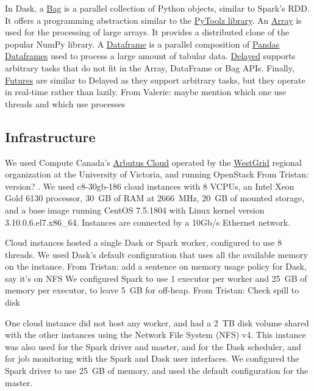 \documentclass[conference]{IEEEtran}
\newcommand{\TG}[1]{\color{cyan}From Tristan: #1 \color{black}}
\newcommand{\VHS}[1]{\color{green}From Valerie: #1 \color{black}}
\begin{document}
In Dask, a \href{https://docs.dask.org/en/latest/bag.html}{Bag} is a parallel
collection of Python objects, similar to Spark's RDD. It offers a programming
abstraction similar to the \href{https://toolz.readthedocs.io/en/latest/}{PyToolz
library}. An \href{https://docs.dask.org/en/latest/array.html}{Array} is used for the
processing of large arrays. It provides a distributed clone of the popular NumPy
library. A \href{https://docs.dask.org/en/latest/dataframe.html}{Dataframe} is a
parallel composition of
\href{http://pandas.pydata.org/pandas-docs/stable/reference/api/pandas.DataFrame.html}{Pandas
Dataframes} used to process a large amount of tabular data.
\href{https://docs.dask.org/en/latest/delayed.html}{Delayed} supports arbitrary tasks
that do not fit in the Array, DataFrame or Bag APIs. Finally,
\href{https://docs.dask.org/en/latest/futures.html}{Futures} are similar to Delayed
as they support arbitrary tasks, but they operate in real-time rather than lazily.
\VHS{maybe mention which one use threads and which use processes}

\subsection{Infrastructure}

 We used Compute Canada's
 \href{https://docs.computecanada.ca/wiki/Cloud_resources}{Arbutus Cloud}
 operated by the \href{https://www.westgrid.ca}{WestGrid} regional
 organization at the University of Victoria, and running OpenStack
 \TG{version?}. We used c8-30gb-186 cloud instances with 8 VCPUs, an Intel
 Xeon Gold 6130 processor, 30~GB of RAM at 2666~MHz, 20~GB of mounted
 storage, and a base image running CentOS 7.5.1804 with  Linux kernel
 version
 3.10.0.6.el7.x86\_64. Instances are connected by a 10Gb/s Ethernet network. 
 
 Cloud instances hosted a single Dask or Spark worker, configured to use 8
 threads. We used Dask's default configuration that uses all the available
 memory on the instance. \TG{add a sentence on memory usage policy for Dask, say it's on NFS} We
 configured Spark to use 1 executor per worker and 25~GB of memory per
 executor, to leave 5~GB for off-heap. \TG{Check spill to disk}
 
 One cloud instance did not host any worker, and had a 2~TB disk volume
 shared with the other instances using the Network File System (NFS) v4.
 This instance was also used for the Spark driver and master, and for the
 Dask scheduler, and for job monitoring with the Spark and Dask user
 interfaces. We configured the Spark driver to use 25~GB of memory, and
 used the default configuration for the master.
\end{document}

